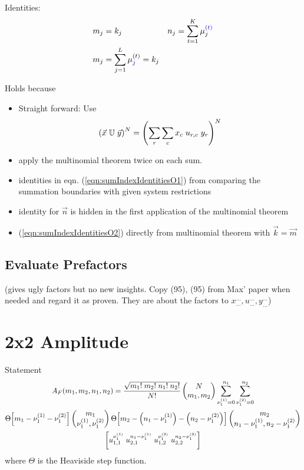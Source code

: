 \documentclass[
	english,
	a4paper,
	fontsize=10pt,
	parskip=half,
	titlepage=true,
	DIV=12,
	final
]{scrreprt}
\begin{document}
Identities:
\begin{align}
	m_j &= k_j
&
	n_j &= \sum_{{\color{blue}} t=1}^{K} \mu_{j}^{{\color{blue} (t)}}
	\label{eqn:sumIndexIdentitiesO1}
\\
	m_j &= \sum_{{\color{blue}} j=1}^{L} \mu_{{\color{blue} j}}^{(t)} = k_j
	\label{eqn:sumIndexIdentitiesO2}
\end{align}

Holds because
\begin{itemize}
\item Straight forward: Use
	\begin{equation}
		\qty( \vec{x} \; \mathbb{U} \; \vec{y} )^N
		=
		\qty( \sum_{r} \sum_{c} x_c \; u_{r,c} \; y_r )^N
	\end{equation}

\item apply the multinomial theorem twice on each sum.
\item identities in eqn. (\ref{eqn:sumIndexIdentitiesO1}) from comparing the summation boundaries with
	given system restrictions
\item identity for $\vec{n}$ is hidden in the first application of the multinomial theorem
\item (\ref{eqn:sumIndexIdentitiesO2}) directly from multinomial theorem with $\vec{k} = \vec{m}$
\end{itemize}


\subsection{Evaluate Prefactors}
(gives ugly factors but no new insights. Copy (95), (95) from Max' paper when needed and regard it as proven. They are about the factors to $x_{\ldots}^{\ldots}, u_{\ldots}^{\ldots}, y_{\ldots}^{\ldots}$)

\section{2x2 Amplitude}
Statement
\begin{multline}
	A_F (m_1, m_2, n_1, n_2)
=
	\frac{\sqrt{m_1! \; m_2! \; n_1! \; n_2!}}{N!}
	\begin{pmatrix}
		N \\ m_1, m_2
	\end{pmatrix}
	\sum_{\nu_1^{(1)} = 0}^{n_1}
	\sum_{\nu_1^{(2)} = 0}^{n_2}
\\
	\Theta\qty[ m_1 - \nu_1^{(1)} - \nu_1^{(2)} ]
	\begin{pmatrix}
		m_1 \\ \nu_1^{(1)}, \nu_1^{(2)}
	\end{pmatrix}
	\Theta\qty[ m_2 - \qty(n_1 - \nu_1^{(1)})  - \qty(n_2 - \nu_1^{(2)}) ]
	\begin{pmatrix}
		m_2 \\ n_1 - \nu_1^{(1)} , n_2 - \nu_1^{(2)}
	\end{pmatrix}
\\
	\qty[
		u_{1,1}^{\nu_1^{(1)}} \; u_{2,1}^{n_1 - \nu_1^{(1)}} \;
		u_{1,2}^{\nu_1^{(2)}} \; u_{2,2}^{n_2 - \nu_1^{(2)}}
	]
\end{multline}
where $\Theta$ is the Heaviside step function.
\end{document}
